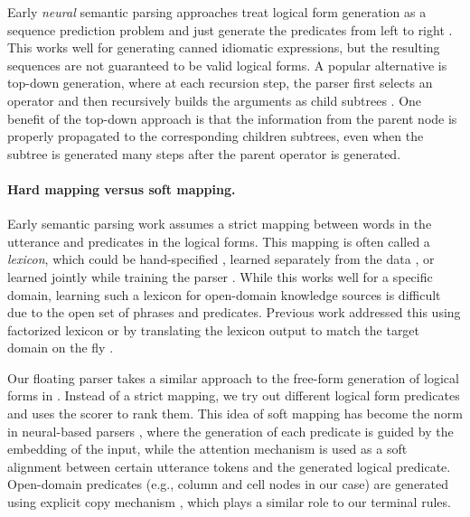 Early \emph{neural} semantic parsing approaches
treat logical form generation as a sequence prediction problem
and just generate the predicates from left to right
\cite{jia2016recombination}.
This works well for generating canned idiomatic expressions,
but the resulting sequences are not guaranteed to be valid logical forms.
A popular alternative is top-down generation,
where at each recursion step,
the parser first selects an operator
and then recursively builds the arguments as child subtrees
\cite{dong2016logical,krishnamurthy2017neural,rabinovich2017abstract,cheng2017learning}.
One benefit of the top-down approach is that the information
from the parent node is properly propagated
to the corresponding children subtrees,
even when the subtree is generated many steps after the parent operator
is generated.

\paragraph{Hard mapping versus soft mapping.}

Early semantic parsing work assumes a strict mapping
between words in the utterance and predicates
in the logical forms.
This mapping is often called a \emph{lexicon},
which could be hand-specified
\cite{zelle96geoquery,unger2011pythia,unger2012template},
learned separately from the data
\cite{cai2013large,berant2013freebase},
or learned jointly while training the parser
\cite{zettlemoyer07relaxed,kwiatkowski10ccg,kwiatkowski11lex}.
While this works well for a specific domain,
learning such a lexicon for open-domain knowledge sources
is difficult due to the open set of phrases and predicates.
Previous work addressed this using factorized lexicon
\cite{kwiatkowski11lex}
or by translating the lexicon output to match the target
domain on the fly
\cite{kwiatkowski2013scaling}.

Our floating parser takes a similar approach to
the free-form generation of logical forms
in \citet{berant2014paraphrasing}.
Instead of a strict mapping,
we try out different logical form predicates and
uses the scorer to rank them.
This idea of soft mapping
has become the norm in neural-based parsers
\cite{jia2016recombination,dong2016logical,krishnamurthy2017neural},
where the generation of each predicate
is guided by the
embedding of the input,
while the attention mechanism \cite{bahdanau2015neural,luong2015translation}
is used as a soft alignment
between certain utterance tokens
and the generated logical predicate.
Open-domain predicates
(e.g., column and cell nodes in our case)
are generated using explicit copy mechanism
\cite{gu2016copying,jia2016recombination},
which plays a similar role to our terminal rules.

